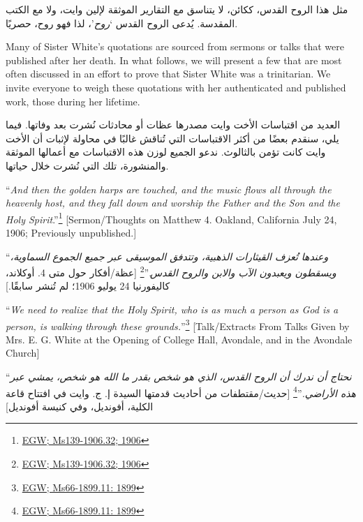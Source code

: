 مثل هذا الروح القدس، ككائن، لا يتناسق مع التقارير الموثقة لإلين وايت، ولا مع الكتب المقدسة. يُدعى الروح القدس ‘\textit{روح}’، لذا فهو روح، حصريًا.


Many of Sister White’s quotations are sourced from sermons or talks that were published after her death. In what follows, we will present a few that are most often discussed in an effort to prove that Sister White was a trinitarian. We invite everyone to weigh these quotations with her authenticated and published work, those during her lifetime.


العديد من اقتباسات الأخت وايت مصدرها عظات أو محادثات نُشرت بعد وفاتها. فيما يلي، سنقدم بعضًا من أكثر الاقتباسات التي تُناقش غالبًا في محاولة لإثبات أن الأخت وايت كانت تؤمن بالثالوث. ندعو الجميع لوزن هذه الاقتباسات مع أعمالها الموثقة والمنشورة، تلك التي نُشرت خلال حياتها.


“\textit{And then the golden harps are touched, and the music flows all through the heavenly host, and they fall down and worship the Father and the Son and the Holy Spirit}.”\footnote{\href{https://egwwritings.org/?ref=en_Ms139-1906.32&para=9579.38}{EGW; Ms139-1906.32; 1906}} [Sermon/Thoughts on Matthew 4. Oakland, California July 24, 1906; Previously unpublished.]


“\textit{وعندها تُعزف القيثارات الذهبية، وتتدفق الموسيقى عبر جميع الجموع السماوية، ويسقطون ويعبدون الآب والابن والروح القدس}.”\footnote{\href{https://egwwritings.org/?ref=en_Ms139-1906.32&para=9579.38}{EGW; Ms139-1906.32; 1906}} [عظة/أفكار حول متى 4. أوكلاند، كاليفورنيا 24 يوليو 1906؛ لم تُنشر سابقًا.]


“\textit{We need to realize that the Holy Spirit, who is as much a person as God is a person, is walking through these grounds.}”\footnote{\href{https://egwwritings.org/?ref=en_Ms66-1899.11&para=6622.19}{EGW; Ms66-1899.11: 1899}} [Talk/Extracts From Talks Given by Mrs. E. G. White at the Opening of College Hall, Avondale, and in the Avondale Church]


“\textit{نحتاج أن ندرك أن الروح القدس، الذي هو شخص بقدر ما الله هو شخص، يمشي عبر هذه الأراضي.}”\footnote{\href{https://egwwritings.org/?ref=en_Ms66-1899.11&para=6622.19}{EGW; Ms66-1899.11: 1899}} [حديث/مقتطفات من أحاديث قدمتها السيدة إ. ج. وايت في افتتاح قاعة الكلية، أفونديل، وفي كنيسة أفونديل]
